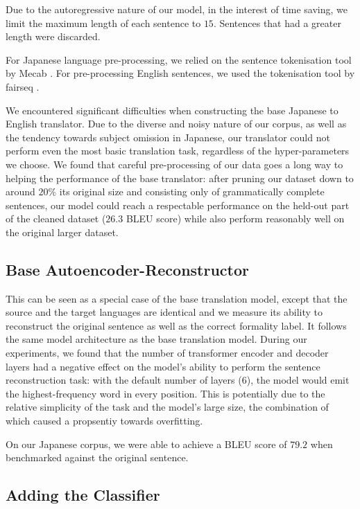 \documentclass[11pt]{article}
\begin{document}
Due to the autoregressive nature of our model, in the interest of time saving, we limit the maximum length of each sentence to $15$. Sentences that had a greater length were discarded.

For Japanese language pre-processing, we relied on the sentence tokenisation tool by Mecab \cite{Kudo2005MeCabY}. For pre-processing English sentences, we used the tokenisation tool by fairseq \cite{ott2019fairseq}.

We encountered significant difficulties when constructing the base Japanese to English translator. Due to the diverse and noisy nature of our corpus, as well as the tendency towards subject omission in Japanese, our translator could not perform even the most basic translation task, regardless of the hyper-parameters we choose. We found that careful pre-processing of our data goes a long way to helping the performance of the base translator: after pruning our dataset down to around $20\%$ its original size and consisting only of grammatically complete sentences, our model could reach a respectable performance on the held-out part of the cleaned dataset ($26.3$ BLEU score) while also perform reasonably well on the original larger dataset.

\subsection{Base Autoencoder-Reconstructor}

This can be seen as a special case of the base translation model, except that the source and the target languages are identical and we measure its ability to reconstruct the original sentence as well as the correct formality label. It follows the same model architecture as the base translation model. During our experiments, we found that the number of transformer encoder and decoder layers had a negative effect on the model's ability to perform the sentence reconstruction task: with the default number of layers ($6$), the model would emit the highest-frequency word in every position. This is potentially due to the relative simplicity of the task and the model's large size, the combination of which caused a propsentiy towards overfitting.

On our Japanese corpus, we were able to achieve a BLEU score of $79.2$ when benchmarked against the original sentence.

\subsection{Adding the Classifier}
\end{document}
